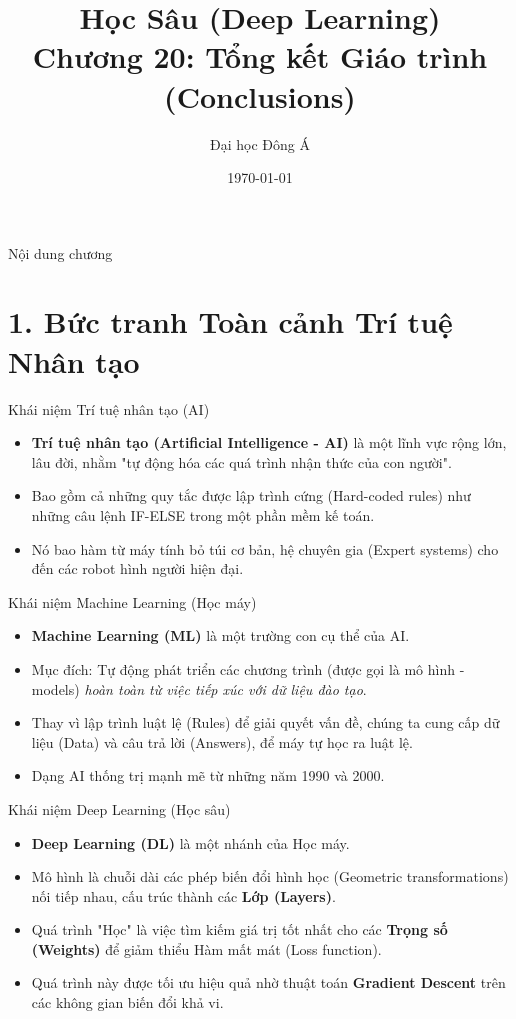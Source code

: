 \documentclass[aspectratio=169]{beamer}
\title[Chương 20: Conclusions]{Học Sâu (Deep Learning) \\ \vspace{0.5cm} \Large Chương 20: Tổng kết Giáo trình (Conclusions)}
\author{Đại học Đông Á}
\date{\today}
\begin{document}
\begin{frame}
    \titlepage
\end{frame}

\begin{frame}{Nội dung chương}
    \tableofcontents
\end{frame}

\section{1. Bức tranh Toàn cảnh Trí tuệ Nhân tạo}

\begin{frame}{Khái niệm Trí tuệ nhân tạo (AI)}
    \begin{itemize}
        \item \textbf{Trí tuệ nhân tạo (Artificial Intelligence - AI)} là một lĩnh vực rộng lớn, lâu đời, nhằm "tự động hóa các quá trình nhận thức của con người".
        \item Bao gồm cả những quy tắc được lập trình cứng (Hard-coded rules) như những câu lệnh IF-ELSE trong một phần mềm kế toán.
        \item Nó bao hàm từ máy tính bỏ túi cơ bản, hệ chuyên gia (Expert systems) cho đến các robot hình người hiện đại.
    \end{itemize}
\end{frame}

\begin{frame}{Khái niệm Machine Learning (Học máy)}
    \begin{itemize}
        \item \textbf{Machine Learning (ML)} là một trường con cụ thể của AI.
        \item Mục đích: Tự động phát triển các chương trình (được gọi là mô hình - models) \textit{hoàn toàn từ việc tiếp xúc với dữ liệu đào tạo}.
        \item Thay vì lập trình luật lệ (Rules) để giải quyết vấn đề, chúng ta cung cấp dữ liệu (Data) và câu trả lời (Answers), để máy tự học ra luật lệ.
        \item Dạng AI thống trị mạnh mẽ từ những năm 1990 và 2000.
    \end{itemize}
\end{frame}

\begin{frame}{Khái niệm Deep Learning (Học sâu)}
    \begin{itemize}
        \item \textbf{Deep Learning (DL)} là một nhánh của Học máy.
        \item Mô hình là chuỗi dài các phép biến đổi hình học (Geometric transformations) nối tiếp nhau, cấu trúc thành các \textbf{Lớp (Layers)}.
        \item Quá trình "Học" là việc tìm kiếm giá trị tốt nhất cho các \textbf{Trọng số (Weights)} để giảm thiểu Hàm mất mát (Loss function).
        \item Quá trình này được tối ưu hiệu quả nhờ thuật toán \textbf{Gradient Descent} trên các không gian biến đổi khả vi.
    \end{itemize}
\end{frame}
\end{document}
